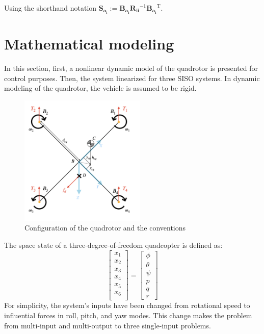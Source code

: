 \documentclass[conference]{IEEEtran}
\begin{document}
Using the shorthand notation $\boldsymbol{S_{a_i}} := \boldsymbol{B_{a_i}R_{ii}}^{-1}\boldsymbol{B_{a_i}}^\mathrm{T}$. %








\section{Mathematical modeling}
In this section, first, a nonlinear dynamic model of the quadrotor is presented for control purposes.
Then, the system linearized for three SISO systems. In dynamic modeling of the quadrotor, the vehicle is assumed to be rigid.
\begin{figure}[htbp]
	\includegraphics[width=6cm]{../Figures/Forces/StandAssumations.png}
	\centering
	\caption{Configuration of the quadrotor and the conventions}
	\label{QuadAssum}
\end{figure}
The space state of a three-degree-of-freedom quadcopter is defined as:
\begin{equation}
	\begin{bmatrix}
		x_1\\x_2\\x_3\\x_4\\x_5\\x_6\\
	\end{bmatrix} = 
\begin{bmatrix}
	\phi\\ \theta \\ \psi \\ p\\ q\\ r
\end{bmatrix}
\end{equation}
For simplicity, the system's inputs have been changed from rotational speed to influential forces in roll, pitch, and yaw modes. This change makes the problem from multi-input and multi-output to three single-input problems.
\end{document}
